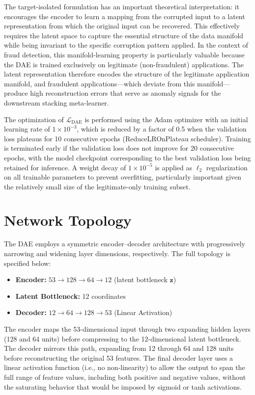 The target-isolated formulation has an important theoretical interpretation: it encourages the encoder to learn a mapping from the corrupted input to a latent representation from which the original input can be recovered. This effectively requires the latent space to capture the essential structure of the data manifold while being invariant to the specific corruption pattern applied. In the context of fraud detection, this manifold-learning property is particularly valuable because the DAE is trained exclusively on legitimate (non-fraudulent) applications. The latent representation therefore encodes the structure of the legitimate application manifold, and fraudulent applications---which deviate from this manifold---produce high reconstruction errors that serve as anomaly signals for the downstream stacking meta-learner.

The optimization of $\mathcal{L}_{\text{DAE}}$ is performed using the Adam optimizer with an initial learning rate of $1 \times 10^{-3}$, which is reduced by a factor of 0.5 when the validation loss plateaus for 10 consecutive epochs (ReduceLROnPlateau scheduler). Training is terminated early if the validation loss does not improve for 20 consecutive epochs, with the model checkpoint corresponding to the best validation loss being retained for inference. A weight decay of $1 \times 10^{-5}$ is applied as $\ell_2$ regularization on all trainable parameters to prevent overfitting, particularly important given the relatively small size of the legitimate-only training subset.

\section{Network Topology}
\label{app:dae-topology}

The DAE employs a symmetric encoder--decoder architecture with progressively narrowing and widening layer dimensions, respectively. The full topology is specified below:

\begin{itemize}
\item \textbf{Encoder:} $53 \to 128 \to 64 \to 12$ (latent bottleneck $\mathbf{z}$)
\item \textbf{Latent Bottleneck:} 12 coordinates
\item \textbf{Decoder:} $12 \to 64 \to 128 \to 53$ (Linear Activation)
\end{itemize}

The encoder maps the 53-dimensional input through two expanding hidden layers (128 and 64 units) before compressing to the 12-dimensional latent bottleneck. The decoder mirrors this path, expanding from 12 through 64 and 128 units before reconstructing the original 53 features. The final decoder layer uses a linear activation function (i.e., no non-linearity) to allow the output to span the full range of feature values, including both positive and negative values, without the saturating behavior that would be imposed by sigmoid or tanh activations.

